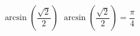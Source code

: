  {$\arcsin \left( \dfrac{\sqrt{2}}{2} \right)$}
{ $\arcsin \left( \dfrac{\sqrt{2}}{2} \right) = \dfrac{\pi}{4}$}

